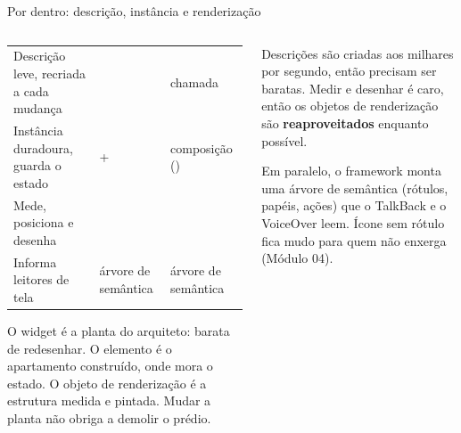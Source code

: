\begin{frame}{Por dentro: descrição, instância e renderização}
  \begin{columns}[T]
    \begin{column}{0.56\textwidth}
      \scriptsize
      \begin{tabularx}{\linewidth}{@{}L l l@{}}
        \toprule
         &  &  \\
        \midrule
        Descrição leve, recriada a cada mudança &  & chamada  \\
        Instância duradoura, guarda o estado &  +  & composição () \\
        Mede, posiciona e desenha &  &  \\
        Informa leitores de tela & árvore de semântica & árvore de semântica \\
        \bottomrule
      \end{tabularx}
      \normalsize
      \begin{analogia}
        O widget é a planta do arquiteto: barata de redesenhar. O elemento é o apartamento construído, onde mora o estado. O objeto de renderização é a estrutura medida e pintada. Mudar a planta não obriga a demolir o prédio.
      \end{analogia}
    \end{column}
    \begin{column}{0.42\textwidth}
      \begin{conceito}
        Descrições são criadas aos milhares por segundo, então precisam ser baratas. Medir e desenhar é caro, então os objetos de renderização são \textbf{reaproveitados} enquanto possível.
      \end{conceito}
      \begin{pordentro}
        Em paralelo, o framework monta uma árvore de semântica (rótulos, papéis, ações) que o TalkBack e o VoiceOver leem. Ícone sem rótulo fica mudo para quem não enxerga (Módulo 04).
      \end{pordentro}
    \end{column}
  \end{columns}
\end{frame}

